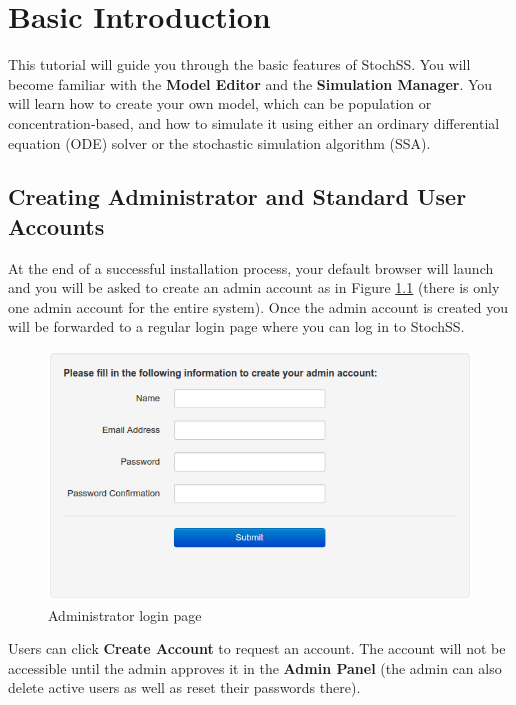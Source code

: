 
\chapter{Basic Introduction}
\label{chapter1}
This tutorial will guide you through the basic features of StochSS. You will become familiar with the \textbf{Model Editor} and the \textbf{Simulation Manager}. You will learn how to create your own model, which can be population or concentration-based, and how to simulate it using either an ordinary differential equation (ODE) solver or the stochastic simulation algorithm (SSA).

\section{Creating Administrator and Standard User Accounts}
At the end of a successful installation process, your default browser will launch and you will be asked to create an admin account as in Figure \ref{fig:admin} (there is only one admin account for the entire system).
Once the admin account is created you will be forwarded to a regular login page where you can log in to StochSS.

\begin{figure}[!htb]
\centering
\includegraphics[scale=0.64]{T1/admin.png}
\caption{Administrator login page}
\label{fig:admin}
\end{figure}

Users can click \textbf{Create Account} to request an account.
The account will not be accessible until the admin approves it in the \textbf{Admin Panel} (the admin can also delete active users as well as reset their passwords there).
%

